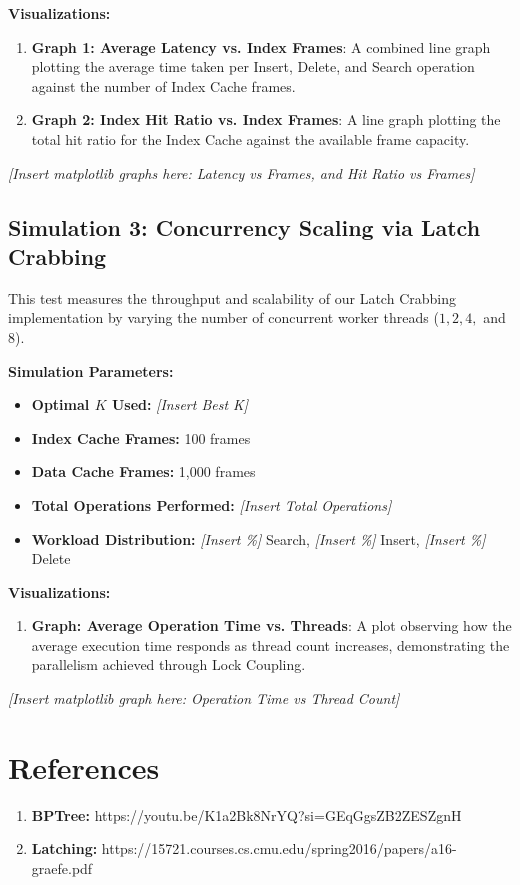 \documentclass[12pt, a4paper]{article}
\begin{document}
\textbf{Visualizations:}
\begin{enumerate}
    \item \textbf{Graph 1: Average Latency vs. Index Frames}: A combined line graph plotting the average time taken per Insert, Delete, and Search operation against the number of Index Cache frames.
    \item \textbf{Graph 2: Index Hit Ratio vs. Index Frames}: A line graph plotting the total hit ratio for the Index Cache against the available frame capacity.
\end{enumerate}

\textit{[Insert matplotlib graphs here: Latency vs Frames, and Hit Ratio vs Frames]}

\subsection{Simulation 3: Concurrency Scaling via Latch Crabbing}
This test measures the throughput and scalability of our Latch Crabbing implementation by varying the number of concurrent worker threads ($1, 2, 4,$ and $8$).

\textbf{Simulation Parameters:}
\begin{itemize}
    \item \textbf{Optimal $K$ Used:} \textit{[Insert Best K]}
    \item \textbf{Index Cache Frames:} 100 frames
    \item \textbf{Data Cache Frames:} 1,000 frames
    \item \textbf{Total Operations Performed:} \textit{[Insert Total Operations]}
    \item \textbf{Workload Distribution:} \textit{[Insert \%]} Search, \textit{[Insert \%]} Insert, \textit{[Insert \%]} Delete
\end{itemize}

\textbf{Visualizations:}
\begin{enumerate}
    \item \textbf{Graph: Average Operation Time vs. Threads}: A plot observing how the average execution time responds as thread count increases, demonstrating the parallelism achieved through Lock Coupling.
\end{enumerate}

\textit{[Insert matplotlib graph here: Operation Time vs Thread Count]}

\newpage

\section{References}
\begin{enumerate}
    \item \textbf{BPTree:} https://youtu.be/K1a2Bk8NrYQ?si=GEqGgsZB2ZESZgnH
    \item \textbf{Latching:} https://15721.courses.cs.cmu.edu/spring2016/papers/a16-graefe.pdf
    
\end{enumerate}
\end{document}
